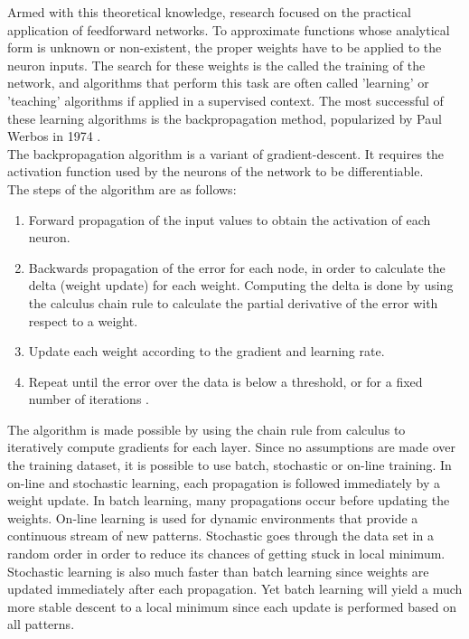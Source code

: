 \documentclass[12pt,oneside]{CUNY_CS_PhD}
\begin{document}
Armed with this theoretical knowledge, research focused on the practical application of feedforward networks. To approximate functions whose analytical form is unknown or non-existent, the proper weights have to be applied to the neuron inputs. The search for these weights is the called the training of the network, and algorithms that perform this task are often called 'learning' or 'teaching' algorithms if applied in a supervised context. The most successful of these learning algorithms is the backpropagation method, popularized by Paul Werbos in 1974 \cite{werbos_backpropagation_1990}.\\
The backpropagation algorithm is a variant of gradient-descent.
It requires the activation function used by the neurons of the network to be differentiable.\\
The steps of the algorithm are as follows:
\begin{enumerate}
\item Forward propagation of the input values to obtain the activation of each neuron.
\item Backwards propagation of the error for each node, in order to calculate the delta (weight update) for each weight. Computing the delta is done by using the calculus chain rule to calculate the partial derivative of the error with respect to a  weight.
\item Update each weight according to the gradient and learning rate. 
\item Repeat until the error over the data is below a threshold, or for a fixed number of iterations .
\end{enumerate}
The algorithm is made possible by using the chain rule from calculus to iteratively compute gradients for each layer. Since no assumptions are made over the training dataset, it is possible to use batch, stochastic or on-line training. In on-line and stochastic learning, each propagation is followed immediately by a weight update. In batch learning, many propagations occur before updating the weights. On-line learning is used for dynamic environments that provide a continuous stream of new patterns. Stochastic goes through the data set in a random order in order to reduce its chances of getting stuck in local minimum. Stochastic learning is also much faster than batch learning since weights are updated immediately after each propagation. Yet batch learning will yield a much more stable descent to a local minimum since each update is performed based on all patterns.\\
\end{document}
